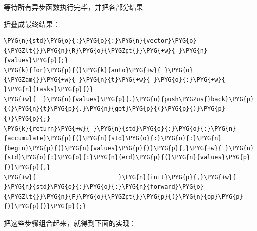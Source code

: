 等待所有异步函数执行完毕，并把各部分结果



折叠成最终结果：



\begin{codeblockbg}
\begin{Verbatim}[commandchars=\\\{\},breaklines=true,breakanywhere=true,fontsize=\codefont,xleftmargin=17bp]
\PYG{n}{std}\PYG{o}{:}\PYG{o}{:}\PYG{n}{vector}\PYG{o}{\PYGZlt{}}\PYG{n}{R}\PYG{o}{\PYGZgt{}}\PYG{+w}{ }\PYG{n}{values}\PYG{p}{;}
\PYG{k}{for}\PYG{p}{(}\PYG{k}{auto}\PYG{+w}{ }\PYG{o}{\PYGZam{}}\PYG{+w}{ }\PYG{n}{t}\PYG{+w}{ }\PYG{o}{:}\PYG{+w}{ }\PYG{n}{tasks}\PYG{p}{)}
\PYG{+w}{  }\PYG{n}{values}\PYG{p}{.}\PYG{n}{push\PYGZus{}back}\PYG{p}{(}\PYG{n}{t}\PYG{p}{.}\PYG{n}{get}\PYG{p}{(}\PYG{p}{)}\PYG{p}{)}\PYG{p}{;}
\PYG{k}{return}\PYG{+w}{ }\PYG{n}{std}\PYG{o}{:}\PYG{o}{:}\PYG{n}{accumulate}\PYG{p}{(}\PYG{n}{std}\PYG{o}{:}\PYG{o}{:}\PYG{n}{begin}\PYG{p}{(}\PYG{n}{values}\PYG{p}{)}\PYG{p}{,}\PYG{+w}{ }\PYG{n}{std}\PYG{o}{:}\PYG{o}{:}\PYG{n}{end}\PYG{p}{(}\PYG{n}{values}\PYG{p}{)}\PYG{p}{,}
\PYG{+w}{                       }\PYG{n}{init}\PYG{p}{,}\PYG{+w}{ }\PYG{n}{std}\PYG{o}{:}\PYG{o}{:}\PYG{n}{forward}\PYG{o}{\PYGZlt{}}\PYG{n}{F}\PYG{o}{\PYGZgt{}}\PYG{p}{(}\PYG{n}{op}\PYG{p}{)}\PYG{p}{)}\PYG{p}{;}
\end{Verbatim}
\end{codeblockbg}



把这些步骤组合起来，就得到下面的实现：



